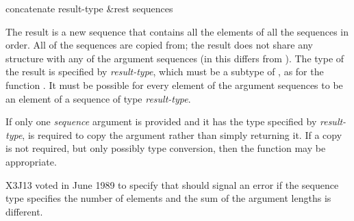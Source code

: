 \begin{defun}[Function]
concatenate result-type &rest sequences

The result is a new sequence that contains all the elements of all the
sequences in order.  All of the sequences are copied from; the result
does not share any structure with any of the argument sequences (in this
 differs from ).  The type of the result is
specified by {\it result-type}, which must be a subtype of ,
as for the function .
It must be possible for every element of the argument sequences to be an
element of a sequence of type {\it result-type}.

If only one {\it sequence} argument is provided
and it has the type specified by {\it result-type},
 is required to copy the argument rather than simply
returning it.  If a copy is not required, but only possibly type conversion,
then the  function may be appropriate.

\begin{newer}
X3J13 voted in June 1989  to specify that
 should signal an error if the sequence type specifies the
number of elements and the sum of the argument lengths is different.
\end{newer}
\end{defun}

